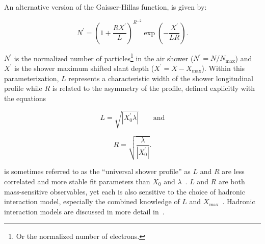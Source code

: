 An alternative version of the Gaisser-Hillas function, is given by:

\begin{equation}
    N^{\prime} = \left( 1 + \frac{R X^{\prime}}{L} \right)^{R^{-2}} \exp \left( -\frac{X^{\prime}}{LR} \right). \label{eq:gh_parameterized}
\end{equation}

\noindent
$N^{\prime}$ is the normalized number of particles\footnote[7]{Or the normalized number of electrons.} in the air shower ($N^{\prime} = N / N_{\text{max}}$) and $X^{\prime}$ is the shower maximum shifted slant depth ($X^{\prime} = X - X_{\text{max}}$).
Within this parameterization, $L$ represents a characteristic width of the shower longitudinal profile while $R$ is related to the asymmetry of the profile, defined explicitly with the equations

\begin{equation}
    L = \sqrt{|X_{0}^{\prime} \lambda|} \qquad \text{and} \label{eq:L}
\end{equation}

\begin{equation}
    R = \sqrt{\frac{\lambda}{|X_{0}^{\prime}|}}. \label{eq:R}
\end{equation}

\noindent
{} is sometimes referred to as the ``universal shower profile'' as $L$ and $R$ are less correlated and more stable fit parameters than $X_{0}$ and $\lambda$~\cite{andringa_astropartphys2011_longitudinalprofiles}.
$L$ and $R$ are both mass-sensitive observables, yet each is also sensitive to the choice of hadronic interaction model, especially the combined knowledge of $L$ and $X_{\text{max}}$~\cite{andringa_astropartphys2011_longitudinalprofiles,icrc2021_buitink_ska,arena2022_buitink_showerlength}.
Hadronic interaction models are discussed in more detail in~.





